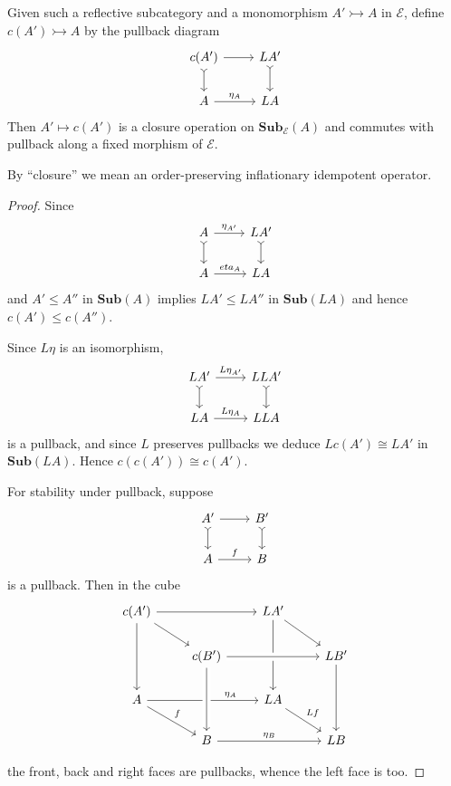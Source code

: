 \documentclass[a4paper]{article}
\renewcommand{\c}[1]{\mathbf{#1}}
\newcommand{\Sub}{{\c{Sub}}}
\newcommand{\mono}{\rightarrowtail}
\begin{document}
\begin{lemma}
  \label{lem:closure operator}
  Given such a reflective subcategory and a monomorphism \(A' \mono A\) in \(\mathcal E\), define \(c(A') \mono A\) by the pullback diagram
  \[
    \begin{tikzcd}
      c(A') \ar[r] \ar[d, tail] & LA' \ar[d, tail] \\
      A \ar[r, "\eta_A"] & LA
    \end{tikzcd}
  \]
  Then \(A' \mapsto c(A')\) is a closure operation on \(\Sub_{\mathcal E}(A)\) and commutes with pullback along a fixed morphism of \(\mathcal E\).
\end{lemma}

By ``closure'' we mean an order-preserving inflationary idempotent operator.

\begin{proof}
  Since
  \[
    \begin{tikzcd}
      A \ar[r, "\eta_{A'}"] \ar[d, tail] & LA' \ar[d, tail] \\
      A \ar[r, "eta_A"] & LA
    \end{tikzcd}
  \]
  and \(A' \leq A''\) in \(\Sub(A)\) implies \(LA' \leq LA''\) in \(\Sub(LA)\) and hence \(c(A') \leq c(A'')\).

  Since \(L\eta\) is an isomorphism,
  \[
    \begin{tikzcd}
      LA' \ar[r, "L\eta_{A'}"] \ar[d, tail] & LLA' \ar[d, tail] \\
      LA \ar[r, "L\eta_A"] & LLA
    \end{tikzcd}
  \]
  is a pullback, and since \(L\) preserves pullbacks we deduce \(Lc(A') \cong LA'\) in \(\Sub(LA)\). Hence \(c(c(A')) \cong c(A')\).

  For stability under pullback, suppose
  \[
    \begin{tikzcd}
      A' \ar[r] \ar[d, tail] & B' \ar[d, tail] \\
      A \ar[r, "f"] & B
    \end{tikzcd}
  \]
  is a pullback. Then in the cube
  \[
    \begin{tikzcd}
      c(A') \ar[rr] \ar[dr] \ar[dd] & & LA' \ar[dr] \ar[dd] \\
      & c(B') \ar[rr, crossing over] & & LB' \ar[dd] \\
      A \ar[rr, "\eta_A", near end] \ar[dr, "f"] && LA \ar[dr, "Lf"] \\
      & B \ar[rr, "\eta_B"] \ar[from=uu, crossing over] && LB
    \end{tikzcd}
  \]

  the front, back and right faces are pullbacks, whence the left face is too.
\end{proof}
\end{document}
